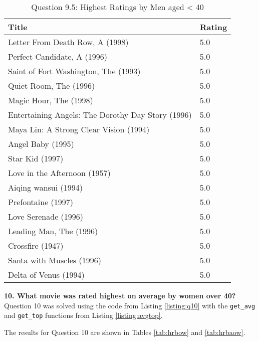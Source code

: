 \begin{table}[h!]
\centering
\begin{tabular}{| l | l |}
\hline
Title & Rating \\
\hline
Letter From Death Row, A (1998) & 5.0 \\
Perfect Candidate, A (1996) & 5.0 \\
Saint of Fort Washington, The (1993) & 5.0 \\
Quiet Room, The (1996) & 5.0 \\
Magic Hour, The (1998) & 5.0 \\
Entertaining Angels: The Dorothy Day Story (1996) & 5.0 \\
Maya Lin: A Strong Clear Vision (1994) & 5.0 \\
Angel Baby (1995) & 5.0 \\
Star Kid (1997) & 5.0 \\
Love in the Afternoon (1957) & 5.0 \\
Aiqing wansui (1994) & 5.0 \\
Prefontaine (1997) & 5.0 \\
Love Serenade (1996) & 5.0 \\
Leading Man, The (1996) & 5.0 \\
Crossfire (1947) & 5.0 \\
Santa with Muscles (1996) & 5.0 \\
Delta of Venus (1994) & 5.0 \\
\hline
\end{tabular}
\caption{Question 9.5: Highest Ratings by Men aged < 40}
\label{tab:hrbaom}
\end{table}

\clearpage

\textbf{10. What movie was rated highest on average by women over 40?}\\

Question 10 was solved using the code from Listing \ref{listing:q10} with the {\tt get\_avg} and {\tt get\_top} functions from Listing \ref{listing:avgtop}.



The results for Question 10 are shown in Tables \ref{tab:hrbow} and \ref{tab:hrbaow}.

